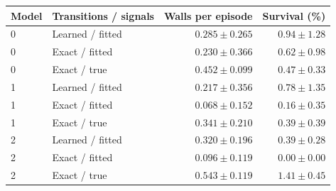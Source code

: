 \begin{tabular}{llrr}
\toprule
\rowcolor{Navy!8}
Model & Transitions / signals & Walls per episode & Survival (\%) \\
\midrule
\rowcolor{JEPA!7}
0 & Learned / fitted & $0.285\pm0.265$ & $0.94\pm1.28$ \\
\rowcolor{Navy!4}
0 & Exact / fitted & $0.230\pm0.366$ & $0.62\pm0.98$ \\
\rowcolor{Real!7}
0 & Exact / true & $0.452\pm0.099$ & $0.47\pm0.33$ \\
\midrule
\rowcolor{JEPA!7}
1 & Learned / fitted & $0.217\pm0.356$ & $0.78\pm1.35$ \\
\rowcolor{Navy!4}
1 & Exact / fitted & $0.068\pm0.152$ & $0.16\pm0.35$ \\
\rowcolor{Real!7}
1 & Exact / true & $0.341\pm0.210$ & $0.39\pm0.39$ \\
\midrule
\rowcolor{JEPA!7}
2 & Learned / fitted & $0.320\pm0.196$ & $0.39\pm0.28$ \\
\rowcolor{Navy!4}
2 & Exact / fitted & $0.096\pm0.119$ & $0.00\pm0.00$ \\
\rowcolor{Real!7}
2 & Exact / true & $0.543\pm0.119$ & $1.41\pm0.45$ \\
\bottomrule
\end{tabular}
